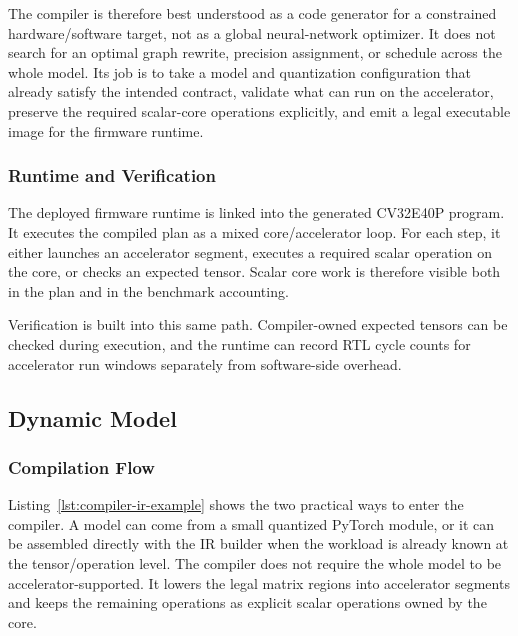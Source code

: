 \documentclass[a4paper, 12pt, titlepage]{article}
\begin{document}
The compiler is therefore best understood as a code generator for a constrained hardware/software target, not as a global neural-network optimizer. It does not search for an optimal graph rewrite, precision assignment, or schedule across the whole model. Its job is to take a model and quantization configuration that already satisfy the intended contract, validate what can run on the accelerator, preserve the required scalar-core operations explicitly, and emit a legal executable image for the firmware runtime.

\subsubsection{Runtime and Verification}
The deployed firmware runtime is linked into the generated CV32E40P program. It executes the compiled plan as a mixed core/accelerator loop. For each step, it either launches an accelerator segment, executes a required scalar operation on the core, or checks an expected tensor. Scalar core work is therefore visible both in the plan and in the benchmark accounting.

Verification is built into this same path. Compiler-owned expected tensors can be checked during execution, and the runtime can record RTL cycle counts for accelerator run windows separately from software-side overhead.

\subsection{Dynamic Model}

\subsubsection{Compilation Flow}
Listing~\ref{lst:compiler-ir-example} shows the two practical ways to enter the compiler. A model can come from a small quantized PyTorch module, or it can be assembled directly with the IR builder when the workload is already known at the tensor/operation level. The compiler does not require the whole model to be accelerator-supported. It lowers the legal matrix regions into accelerator segments and keeps the remaining operations as explicit scalar operations owned by the core.
\end{document}
